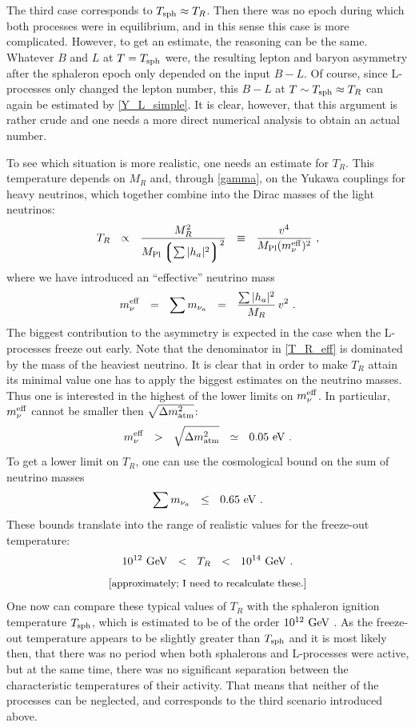 \documentclass[12pt]{revtex4}
\newcommand{\lgr}{\left\lgroup}
\newcommand{\rgr}{\right\rgroup}
\newcommand{\Mpl}{M_{\rm Pl}}
\newcommand{\Tsph}{T_{\rm sph}}
\newcommand{\meff}{m^{\rm eff}_\nu}
\newcommand{\GeV}{{\rm GeV}}
\newcommand{\eV}{{\rm eV}}
\begin{document}
	The third case corresponds to $ \Tsph \approx T_R $.
	Then there was no epoch during which both processes
	were in equilibrium, and in this sense this case is more complicated.
	However, to get an estimate, the reasoning can be 
	the same.
	Whatever $ B $ and $ L $ at $ T = \Tsph $ were, the resulting
	lepton and baryon asymmetry after the sphaleron epoch only
	depended on the input $ B - L $.
	Of course, since L-processes only changed the lepton number,
	this $ B - L $ at  $ T \sim \Tsph \approx T_R $ can 
	again be estimated by \eqref{Y_L_simple}.
	It is clear, however, that this argument is rather crude and 
	one needs a more direct numerical analysis to obtain an actual
	number.

	To see which situation is more realistic, one needs an estimate
	for $ T_R $. 
	This temperature depends on $ M_R $ and, through \eqref{gamma},
	on the Yukawa couplings for heavy neutrinos, which together 
	combine into the Dirac masses of the light neutrinos:
\begin{equation}
\label{T_R_eff}
	T_R  ~~\propto~~ \frac{M_R^2}{\Mpl \lgr \sum |h_a|^2 \rgr^2}
		~~\equiv~~ \frac{v^4}{\Mpl (\meff)^2}~,
\end{equation}
	where we have introduced an ``effective'' neutrino mass
\[
	\meff ~~=~~ \sum m_{\nu_a} ~~=~~ \frac{\sum |h_a|^2}{M_R}\,v^2~.
\]
	The biggest contribution to the asymmetry is expected in the case
	when the L-processes freeze out early. 
	Note that the denominator in \eqref{T_R_eff} is dominated by the mass
	of the heaviest neutrino.
	It is clear that in order to make $ T_R $  attain its minimal
	value one has to apply the biggest estimates on the neutrino masses.
	Thus one is interested in the highest of the lower limits on
	$ \meff $.
	In particular, $ \meff $ cannot be smaller then 
	$ \sqrt{\Delta m_{\rm atm}^2}$:
\[
	\meff ~~>~~ \sqrt{\Delta m_{\rm atm}^2} ~~\simeq~~ 0.05~\eV~.
\]
	To get a lower limit on $ T_R $, one can use the cosmological
	bound on the sum of neutrino masses
\[
	\sum m_{\nu_a} ~~\leq~~ 0.65~\eV~.
\]
	These bounds translate into the range of realistic values for the
	freeze-out temperature:
\[
	10^{12}~\GeV ~~<~~ T_R ~~<~~ 10^{14}~\GeV~.
\]
\[
	[\textrm{\small approximately; I need to recalculate these.}]
\]
	One now can compare these typical values of $ T_R $ with the 
	sphaleron ignition temperature $ \Tsph $, which is estimated
	to be of the order $ 10^{12}~\GeV $ 
\cite{Buchmuller:2005eh}.
	As the freeze-out temperature appears to be slightly greater
	than $ \Tsph $ and 	
	it is most likely then, that there was no period when
	both sphalerons and L-processes were active, but at the same
	time, there was no significant separation between the characteristic 
	temperatures of their activity.
	That means that neither of the processes can be neglected,
	and corresponds to the third scenario introduced above.
\end{document}
